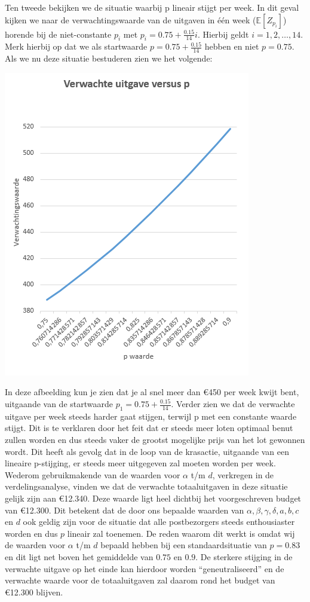 Ten tweede bekijken we de situatie waarbij p lineair stijgt per week. In dit geval kijken we naar de verwachtingswaarde van de uitgaven in één week ($\mathbb{E}[Z_{p_{i}}]$) horende bij de niet-constante $p_{i}$ met $p_{i} = 0.75 + \frac{0.15}{14}i$. Hierbij geldt $i = 1,2,\ldots, 14$. Merk hierbij op dat we als startwaarde $p = 0.75 + \frac{0.15}{14}$ hebben en niet $p = 0.75$. Als we nu deze situatie bestuderen zien we het volgende:

\includegraphics[scale=0.75]{HugoKR2}

In deze afbeelding kun je zien dat je al snel meer dan \euro450 per week kwijt bent, uitgaande van de startwaarde $p_{1} =0.75 + \frac{0.15}{14}$. Verder zien we dat de verwachte uitgave per week steeds harder gaat stijgen, terwijl p met een constante waarde stijgt. Dit is te verklaren door het feit dat er steeds meer loten optimaal benut zullen worden en dus steeds vaker de grootst mogelijke prijs van het lot gewonnen wordt. Dit heeft als gevolg dat in de loop van de krasactie, uitgaande van een lineaire p-stijging, er steeds meer uitgegeven zal moeten worden per week.\\

Wederom gebruikmakende van de waarden voor $\alpha$ t/m $d$, verkregen in de verdelingsanalyse, vinden we dat de verwachte totaaluitgaven in deze situatie gelijk zijn aan \euro12.340. Deze waarde ligt heel dichtbij het voorgeschreven budget van \euro12.300. Dit betekent dat de door ons bepaalde waarden van $\alpha, \beta, \gamma, \delta, a,b,c$ en $d$ ook geldig zijn voor de situatie dat alle postbezorgers steeds enthousiaster worden en dus $p$ lineair zal toenemen. De reden waarom dit werkt is omdat wij de waarden voor $\alpha$ t/m $d$ bepaald hebben bij een  standaardsituatie van $p = 0.83$ en dit ligt net boven het gemiddelde van $0.75$ en $0.9$. De sterkere stijging in de verwachte uitgave op het einde kan hierdoor worden ``geneutraliseerd'' en de verwachte waarde voor de totaaluitgaven zal daarom rond het budget van \euro12.300 blijven.  


